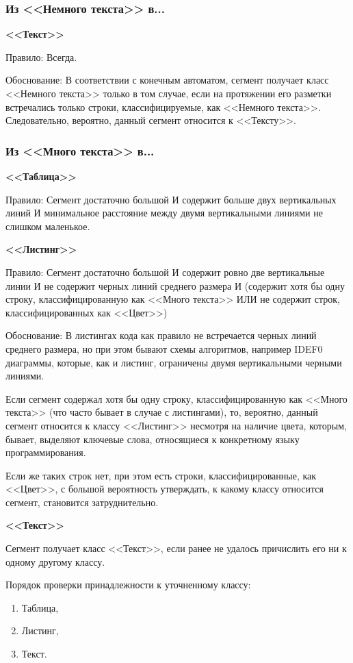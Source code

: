 \subsubsection*{Из <<Немного текста>> в...}

\textbf{<<Текст>>}

Правило: Всегда.

Обоснование: В соответствии с конечным автоматом, сегмент получает класс <<Немного текста>> только в том случае, если на протяжении его разметки встречались только строки, классифицируемые, как <<Немного текста>>.
Следовательно, вероятно, данный сегмент относится к <<Тексту>>.

\subsubsection*{Из <<Много текста>> в...}

\textbf{<<Таблица>>}

Правило: Сегмент достаточно большой И содержит больше двух вертикальных линий И минимальное расстояние между двумя вертикальными линиями не слишком маленькое.

\textbf{<<Листинг>>}

Правило: Сегмент достаточно большой И содержит ровно две вертикальные линии И не содержит черных линий среднего размера И (содержит хотя бы одну строку, классифицированную как <<Много текста>> ИЛИ не содержит строк, классифицированных как <<Цвет>>)

Обоснование: В листингах кода как правило не встречается черных линий среднего размера, но при этом бывают схемы алгоритмов, например IDEF0 диаграммы, которые, как и листинг, ограничены двумя вертикальными черными линиями.

Если сегмент содержал хотя бы одну строку, классифицированную как <<Много текста>> (что часто бывает в случае с листингами), то, вероятно, данный сегмент относится к классу <<Листинг>> несмотря на наличие цвета, которым, бывает, выделяют ключевые слова, относящиеся к конкретному языку программирования.

Если же таких строк нет, при этом есть строки, классифицированные, как <<Цвет>>, с большой вероятность утверждать, к какому классу относится сегмент, становится затруднительно.

\textbf{<<Текст>>}

Сегмент получает класс <<Текст>>, если ранее не удалось причислить его ни к одному другому классу.

Порядок проверки принадлежности к уточненному классу:
\begin{enumerate}
    \item Таблица,
    \item Листинг,
    \item Текст.
\end{enumerate}


